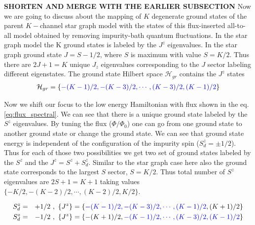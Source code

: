 \documentclass[reprint,prb,superscriptaddress]{revtex4-2}
\begin{document}
\textbf{SHORTEN AND MERGE WITH THE EARLIER SUBSECTION}
\noindent Now we are going to discuss about the mapping of $K$ degenerate ground states of the parent $K-$channel star graph model with the states of this flux-inserted all-to-all model obtained by removing impurity-bath quantum fluctuations. In the star graph model the K ground states is labeled by the $J^z$ eigenvalues. In the star graph ground state $J=S-1/2$, where $S$ is maximum with value $S=K/2$. Thus there are $2J+1=K$ unique $J_z$ eigenvalues corresponding to the $J$ sector labeling different eigenstates. The ground state Hilbert space $\mathcal{H}_{gr}$ contains the $J^z$ states
\begin{eqnarray}
\mathcal{H}_{gr}=\{\textcolor{blue}{-(K-1)/2,-(K-3)/2,\cdots , (K-3)/2,(K-1)/2}\} \nonumber\\
\label{eq:stargraph_states}
\end{eqnarray}
\par Now we shift our focus to the low energy Hamiltonian with flux shown in the eq.\eqref{eq:flux_spectral}. We can see that there is a unique ground state labeled by the $S^z$ eigenvalues. By tuning the flux ($\Phi/\Phi_0$) one can go from one ground state to another ground state or change the ground state. We can see that ground state energy is independent of the configuration of the impurity spin ($S_d^z=\pm 1/2$). Thus for each of those two possibilities we get two set of ground states labeled by the $S^z$ and the $J^z=S^z+S^z_d$. Similar to the star graph case here also the ground state corresponds to the largest $S$ sector, $S=K/2$. Thus total number of $S^z$ eigenvalues are $2S+1=K+1$ taking values $\{ -K/2, -(K-2)/2, \cdots, (K-2)/2, K/2 \}$.
\begin{widetext}
\begin{eqnarray}
S_d^z &=& +1/2~,~ \{J^z\}=\{ \textcolor{blue}{-(K-1)/2, -(K-3)/2, \cdots, (K-1)/2}, (K+1)/2\} \nonumber\\
S_d^z &=& -1/2~,~ \{J^z\}=\{-(K+1)/2,\textcolor{blue}{ -(K-1)/2, \cdots, (K-3)/2, (K-1)/2 } \}
\label{eq:all_to_all_states}
\end{eqnarray}
\end{widetext}
\end{document}
